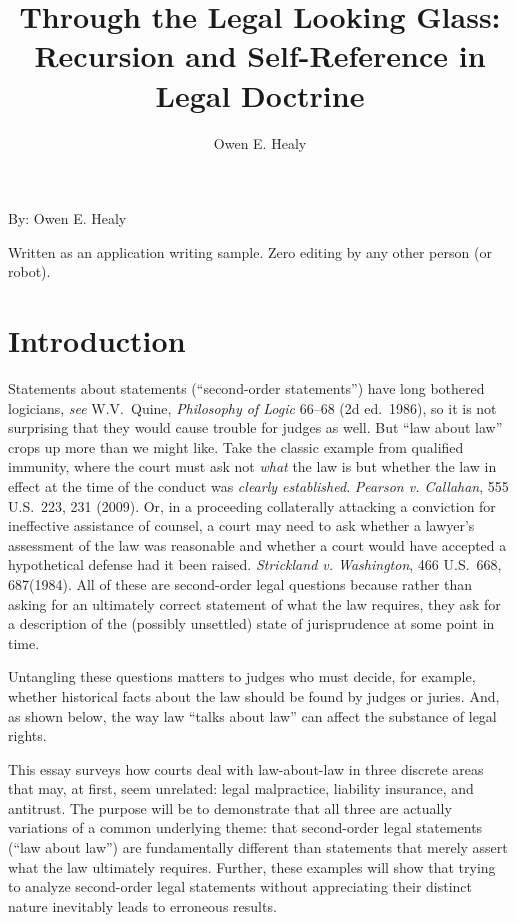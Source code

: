 \documentclass[
  12pt,
  letterpaper,
]{scrartcl}
\title{Through the Legal Looking Glass: Recursion and Self-Reference in Legal Doctrine}
\author{Owen E. Healy}
\begin{document}
\begin{center}\end{center}
  
\vspace{12pt}\noindent\begin{minipage}{4in}
  \setlength{\parskip}{6pt}
  
  \noindent By: Owen E. Healy

  \noindent Written as an application writing sample. Zero editing by any other person (or robot).
\end{minipage}


\vspace{12pt}\section{Introduction}

Statements about statements (``second-order statements'') have long bothered
logicians, \textit{see} W.V.~Quine, \textit{Philosophy of Logic} 66--68 (2d
ed.~1986), so it is not surprising that they would cause trouble for judges as
well. But ``law about law'' crops up more than we might like. Take the classic
example from qualified immunity, where the court must ask not \textit{what} the
law is but whether the law in effect at the time of the conduct was \textit{clearly
established}. \textit{Pearson v. Callahan}, 555 U.S.~223, 231 (2009). Or, in
a proceeding collaterally attacking a conviction for ineffective assistance of
counsel, a court may need to ask whether a lawyer's assessment of the law was reasonable
and whether a court would have accepted a hypothetical defense had it been raised.
\textit{Strickland v. Washington}, 466 U.S.~668, 687(1984).
All of these are second-order legal questions because rather than asking for an ultimately
correct statement of what the law requires, they ask for a description of the
(possibly unsettled) state of jurisprudence at some point in time.

Untangling these questions matters to judges who must decide, for
example, whether historical facts about the law should be found by judges or
juries. And, as shown below, the way law ``talks about law'' can affect the
substance of legal rights.

This essay surveys how courts deal with law-about-law in three discrete areas
that may, at first, seem unrelated: legal malpractice, liability insurance, and antitrust. The purpose will be to demonstrate that all three
are actually variations of a common underlying theme: that second-order legal statements
(``law about law'') are fundamentally different
than statements that merely assert what the law ultimately requires. Further,
these examples will show that trying to analyze second-order legal statements without
appreciating their distinct nature inevitably leads to erroneous results.
\end{document}
